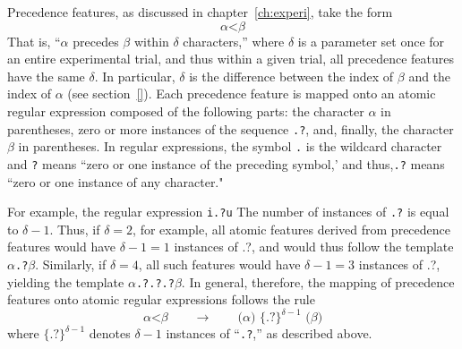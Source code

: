 
Precedence features, as discussed in chapter~\ref{ch:experi}, take the form
\begin{equation*}
\alpha\text{<}\beta
\end{equation*}
That is, ``$\alpha$ precedes $\beta$ within $\delta$ characters,'' where $\delta$ is 
a parameter set once for an entire experimental trial, and thus within a given trial, all precedence features
have the same $\delta$.  In particular, $\delta$ is the difference between the 
index of $\beta$ and the index of $\alpha$ (see section~\ref{}).
Each precedence feature is mapped onto an atomic regular expression composed of the following parts:
the character $\alpha$ in parentheses, zero or more instances of the sequence \texttt{.?}, and, finally,
the character $\beta$ in parentheses. In regular expressions, the symbol \texttt{.} is the wildcard character and \texttt{?} means ``zero or one instance of the preceding symbol,'  and thus,\texttt{.?} means ``zero or one instance
of any character."

For example, the regular expression \texttt{i.?u}
The number of instances of \texttt{.?} is equal to $\delta - 1$. Thus, if $\delta = 2$, for example, all atomic
features derived from precedence features would have $\delta - 1 = 1$ 
instances of {.?}, and would thus follow the template $\alpha$\texttt{.?}$\beta$. 
Similarly, if $\delta = 4$, all such features would have $\delta - 1 = 3$ instances 
of {.?}, yielding the template $\alpha$\texttt{.?}\texttt{.?}\texttt{.?}$\beta$. 
In general, therefore, the mapping of precedence features onto atomic regular expressions 
follows the rule
\begin{equation}
\alpha\text{<}\beta \qquad \to \qquad \texttt{(}\alpha \texttt{)}\,\, {\{\texttt{.?}\}}^{\delta-1} \,\, \texttt{(} \beta \texttt{)}
\end{equation}
where ${\{\texttt{.?}\}}^{\delta-1}$ denotes ${\delta-1} $ instances of ``\texttt{.?},'' as described above. 

